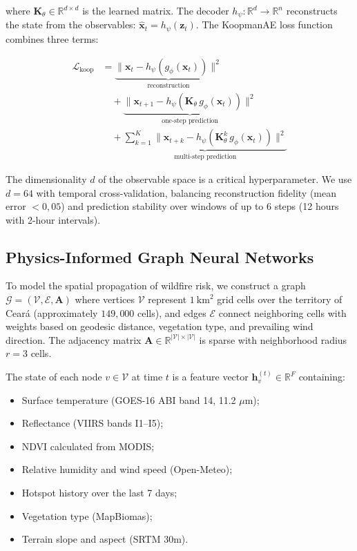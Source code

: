 \documentclass[preprint,12pt,times,numbers]{elsarticle}
\begin{document}
where $\mathbf{K}_\theta \in \mathbb{R}^{d \times d}$ is the learned matrix. The decoder $h_\psi: \mathbb{R}^d \to \mathbb{R}^n$ reconstructs the state from the observables: $\hat{\mathbf{x}}_t = h_\psi(\mathbf{z}_t)$. The KoopmanAE loss function combines three terms:

\begin{align}
\mathcal{L}_{\text{koop}} &= \underbrace{\|\mathbf{x}_t - h_\psi(g_\phi(\mathbf{x}_t))\|^2}_{\text{reconstruction}} \nonumber \\
&\quad + \underbrace{\|\mathbf{x}_{t+1} - h_\psi(\mathbf{K}_\theta \, g_\phi(\mathbf{x}_t))\|^2}_{\text{one-step prediction}} \nonumber \\
&\quad + \underbrace{\sum_{k=1}^{K} \|\mathbf{x}_{t+k} - h_\psi(\mathbf{K}_\theta^k \, g_\phi(\mathbf{x}_t))\|^2}_{\text{multi-step prediction}}
\label{eq:koopman_loss}
\end{align}

The dimensionality $d$ of the observable space is a critical hyperparameter. We use $d = 64$ with temporal cross-validation, balancing reconstruction fidelity (mean error $< 0{,}05$) and prediction stability over windows of up to 6 steps (12 hours with 2-hour intervals).

\subsection{Physics-Informed Graph Neural Networks}
\label{sec:pignn}

To model the spatial propagation of wildfire risk, we construct a graph $\mathcal{G} = (\mathcal{V}, \mathcal{E}, \mathbf{A})$ where vertices $\mathcal{V}$ represent $1\ \text{km}^2$ grid cells over the territory of Ceará (approximately $149,000$ cells), and edges $\mathcal{E}$ connect neighboring cells with weights based on geodesic distance, vegetation type, and prevailing wind direction. The adjacency matrix $\mathbf{A} \in \mathbb{R}^{|\mathcal{V}| \times |\mathcal{V}|}$ is sparse with neighborhood radius $r = 3$ cells.

The state of each node $v \in \mathcal{V}$ at time $t$ is a feature vector $\mathbf{h}_v^{(t)} \in \mathbb{R}^{F}$ containing:
\begin{itemize}
    \item Surface temperature (GOES-16 ABI band 14, 11.2 $\mu$m);
    \item Reflectance (VIIRS bands I1--I5);
    \item NDVI calculated from MODIS;
    \item Relative humidity and wind speed (Open-Meteo);
    \item Hotspot history over the last 7 days;
    \item Vegetation type (MapBiomas);
    \item Terrain slope and aspect (SRTM 30m).
\end{itemize}
\end{document}
